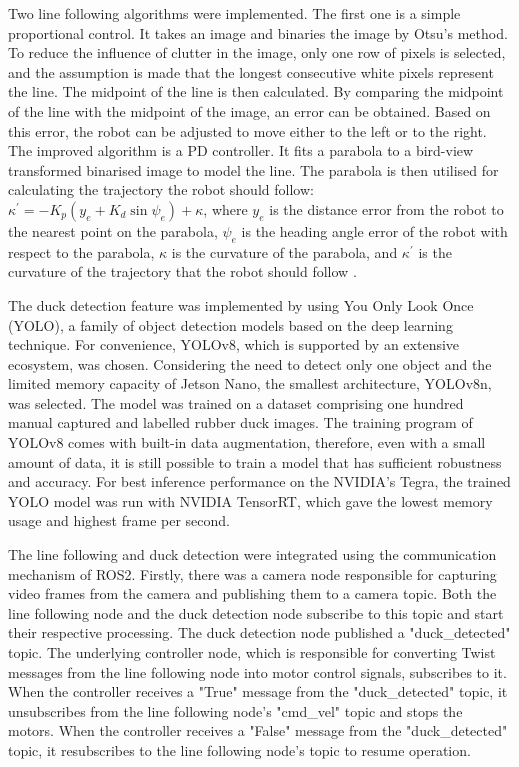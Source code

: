 Two line following algorithms were implemented. The first one is a simple proportional control. It takes an image and binaries the image by Otsu's method. To reduce the influence of clutter in the image, only one row of pixels is selected, and the assumption is made that the longest consecutive white pixels represent the line. The midpoint of the line is then calculated. By comparing the midpoint of the line with the midpoint of the image, an error can be obtained. Based on this error, the robot can be adjusted to move either to the left or to the right. The improved algorithm is a PD controller. It fits a parabola to a bird-view transformed binarised image to model the line. The parabola is then utilised for calculating the trajectory the robot should follow: $\kappa^\prime = -K_p(y_e + K_d \sin \psi_e) + \kappa$, where $y_e$ is the distance error from the robot to the nearest point on the parabola, $\psi_e$ is the heading angle error of the robot with respect to the parabola, $\kappa$ is the curvature of the parabola, and $\kappa^\prime$ is the curvature of the trajectory that the robot should follow \cite{ref:fast-line-following-robots}.

The duck detection feature was implemented by using You Only Look Once (YOLO), a family of object detection models based on the deep learning technique. For convenience, YOLOv8, which is supported by an extensive ecosystem, was chosen. Considering the need to detect only one object and the limited memory capacity of Jetson Nano, the smallest architecture, YOLOv8n, was selected. The model was trained on a dataset comprising one hundred manual captured and labelled rubber duck images. The training program of YOLOv8 comes with built-in data augmentation, therefore, even with a small amount of data, it is still possible to train a model that has sufficient robustness and accuracy. For best inference performance on the NVIDIA's Tegra, the trained YOLO model was run with NVIDIA TensorRT, which gave the lowest memory usage and highest frame per second.

The line following and duck detection were integrated using the communication mechanism of ROS2. Firstly, there was a camera node responsible for capturing video frames from the camera and publishing them to a camera topic. Both the line following node and the duck detection node subscribe to this topic and start their respective processing. The duck detection node published a "duck\_detected" topic. The underlying controller node, which is responsible for converting Twist messages from the line following node into motor control signals, subscribes to it. When the controller receives a "True" message from the "duck\_detected" topic, it unsubscribes from the line following node's "cmd\_vel" topic and stops the motors. When the controller receives a "False" message from the "duck\_detected" topic, it resubscribes to the line following node's topic to resume operation.

